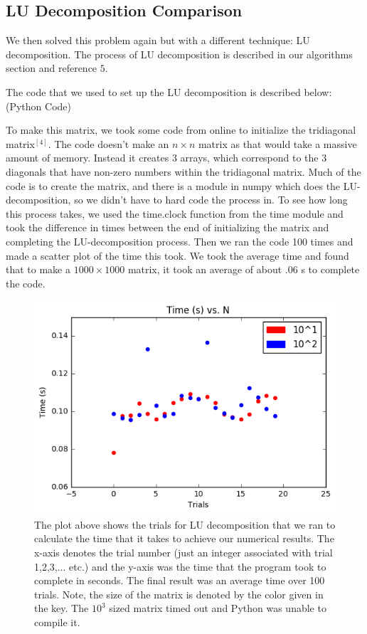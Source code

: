 \documentclass{article}
\begin{document}
\newpage
\subsection{LU Decomposition Comparison}
We then solved this problem again but with a different technique: LU decomposition. The process of LU decomposition is described in our algorithms section and reference ${5}$. 

The code that we used to set up the LU decomposition is described below: (Python Code)



To make this matrix, we took some code from online to initialize the tridiagonal matrix$^{[4]}$. The code doesn't make an $n\times n$ matrix as that would take a massive amount of memory. Instead it creates 3 arrays, which correspond to the 3 diagonals that have non-zero numbers within the tridiagonal matrix. Much of the code is to create the matrix, and there is a module in numpy which does the LU-decomposition, so we didn't have to hard code the process in. To see how long this process takes, we used the time.clock function from the time module and took the difference in times between the end of initializing the matrix and completing the LU-decomposition process. Then we ran the code 100 times and made a scatter plot of the time this took. We took the average time and found that to make a $1000\times1000$ matrix, it took an average of about .06 s to complete the code.

\begin{figure}
	\includegraphics[width = \linewidth]{LU_N_comparison_graph.png}
	\caption{The plot above shows the trials for LU decomposition that we ran to calculate the time that it takes to achieve our numerical results. The x-axis denotes the trial number (just an integer associated with trial 1,2,3,... etc.) and the y-axis was the time that the program took to complete in seconds. The final result was an average time over 100 trials. Note, the size of the matrix is denoted by the color given in the key. The $10^{3}$ sized matrix timed out and Python was unable to compile it.}
\end{figure}
\end{document}
